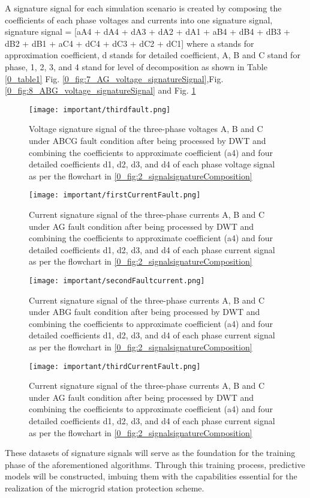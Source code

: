 \documentclass[8pt,a4paper,oneside]{elsarticle}
\begin{document}
A signature signal for each simulation scenario is created by
composing the coefficients of each phase voltages and
currents into one signature signal, signature signal = [aA4 + dA4 + dA3 + dA2 + dA1 + aB4 + dB4 + dB3 + dB2 + dB1
+ aC4 + dC4 + dC3 + dC2 + dC1] where a stands for approximation coefficient, d stands for detailed coefficient, A, B and C stand for phase, 1, 2, 3, and 4 stand for level of decomposition as shown in Table \ref{0_table1} Fig. \ref{0_fig:7_AG_voltage_signatureSignal},Fig. \ref{0_fig:8_ABG_voltage_signatureSignal}
and Fig. \ref{0_fig:9_ABCG_voltage_signatureSignal}
\begin{figure}[H]
    \centering
    \texttt{[image: important/thirdfault.png]}
    \caption{Voltage signature signal of the three-phase voltages A, B and C under
ABCG fault condition after being processed by DWT and combining the coefficients to approximate coefficient (a4) and four detailed coefficients d1, d2, d3, and d4 of each phase voltage signal as per the flowchart in \ref{0_fig:2_signalsignatureComposition}}
    \label{0_fig:9_ABCG_voltage_signatureSignal}
\end{figure}
\begin{figure}[H]
    \centering
    \texttt{[image: important/firstCurrentFault.png]}
    \caption{Current signature signal of the three-phase currents A, B and C under
AG fault condition after being processed by DWT and combining the coefficients to approximate coefficient (a4) and four detailed coefficients d1, d2, d3, and d4 of each phase current signal as per the flowchart in \ref{0_fig:2_signalsignatureComposition}}
    \label{0_fig:10_AG_current_signatureSignal}
\end{figure}
\begin{figure}[H]
    \centering
    \texttt{[image: important/secondFaultcurrent.png]}
    \caption{Current signature signal of the three-phase currents A, B and C under
ABG fault condition after being processed by DWT and combining the coefficients to approximate coefficient (a4) and four detailed coefficients d1, d2, d3, and d4 of each phase current signal as per the flowchart in \ref{0_fig:2_signalsignatureComposition}}
    \label{0_fig:11_ABG_current_signatureSignal}
\end{figure}
\begin{figure}[H]
    \centering
    \texttt{[image: important/thirdCurrentFault.png]}
    \caption{Current signature signal of the three-phase currents A, B and C under
AG fault condition after being processed by DWT and combining the coefficients to approximate coefficient (a4) and four detailed coefficients d1, d2, d3, and d4 of each phase current signal as per the flowchart in \ref{0_fig:2_signalsignatureComposition}}
    \label{0_fig:12_ABCG_current_signatureSignal}
\end{figure}
These datasets of signature signals will serve as the foundation for the training phase of the aforementioned algorithms. Through this training process, predictive models will be constructed, imbuing them with the capabilities essential for the realization of the microgrid station protection scheme. 
\end{document}
